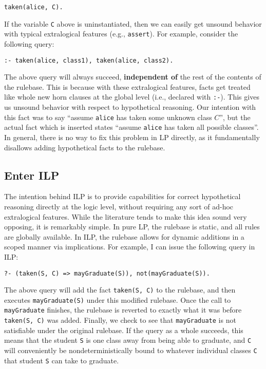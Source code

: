 \begin{verbatim}
taken(alice, C).
\end{verbatim}

\noindent If the variable \texttt{C} above is uninstantiated, then we can easily get unsound behavior with typical extralogical features (e.g., \texttt{assert}).
For example, consider the following query:

\begin{verbatim}
:- taken(alice, class1), taken(alice, class2).
\end{verbatim}

\noindent The above query will always succeed, \textbf{independent of} the rest of the contents of the rulebase.
This is because with these extralogical features, facts get treated like whole new horn clauses at the global level (i.e., declared with \texttt{:-}).
This gives us unsound behavior with respect to hypothetical reasoning.
Our intention with this fact was to say ``assume \texttt{alice} has taken some unknown class $C$'', but the actual fact which is inserted states ``assume \texttt{alice} has taken all possible classes''.
In general, there is no way to fix this problem in LP directly, as it fundamentally disallows adding hypothetical facts to the rulebase.

\subsection{Enter ILP}
The intention behind ILP is to provide capabilities for correct hypothetical reasoning directly at the logic level, without requiring any sort of ad-hoc extralogical features.
While the literature tends to make this idea sound very opposing, it is remarkably simple.
In pure LP, the rulebase is static, and all rules are globally available.
In ILP, the rulebase allows for dynamic additions in a scoped manner via implications.
For example, I can issue the following query in ILP:

\begin{verbatim}
?- (taken(S, C) => mayGraduate(S)), not(mayGraduate(S)).
\end{verbatim}

The above query will add the fact \texttt{taken(S, C)} to the rulebase, and then executes \texttt{mayGraduate(S)} under this modified rulebase.
Once the call to \texttt{mayGraduate} finishes, the rulebase is reverted to exactly what it was before \texttt{taken(S, C)} was added.
Finally, we check to see that \texttt{mayGraduate} is not satisfiable under the original rulebase.
If the query as a whole succeeds, this means that the student \texttt{S} is one class away from being able to graduate, and \texttt{C} will conveniently be nondeterministically bound to whatever individual classes \texttt{C} that student \texttt{S} can take to graduate.

